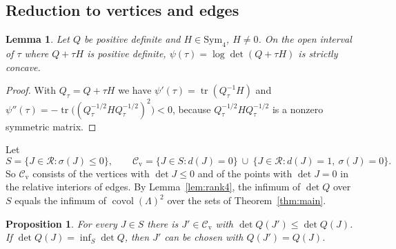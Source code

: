 \documentclass[11pt,reqno]{amsart}
\renewcommand{\_}{\origunderscore\allowbreak}
\numberwithin{equation}{section}
\theoremstyle{plain}
\newtheorem{prop}[thm]{Proposition}
\newtheorem{lem}[thm]{Lemma}
\theoremstyle{definition}
\theoremstyle{remark}
\newcommand{\Rk}{\mathcal{R}}
\newcommand{\Sym}{\mathrm{Sym}}
\newcommand{\covol}{\operatorname{covol}}
\newcommand{\cand}{\mathcal{C}_{\mathrm{v}}}
\begin{document}
\subsection{Reduction to vertices and edges}\label{sec:reduction}

\begin{lem}\label{lem:logdet}
Let $Q$ be positive definite and $H\in\Sym_4$, $H\ne0$. On the open interval of $\tau$ where $Q+\tau H$ is positive definite, $\psi(\tau)=\log\det(Q+\tau H)$ is strictly concave.
\end{lem}

\begin{proof}
With $Q_\tau=Q+\tau H$ we have $\psi'(\tau)=\operatorname{tr}(Q_\tau^{-1}H)$ and $\psi''(\tau)=-\operatorname{tr}\bigl((Q_\tau^{-1/2}HQ_\tau^{-1/2})^2\bigr)<0$, because $Q_\tau^{-1/2}HQ_\tau^{-1/2}$ is a nonzero symmetric matrix.
\end{proof}

Let
\[
S=\{J\in\Rk:\sigma(J)\le0\},\qquad
\cand=\{J\in S: d(J)=0\}\ \cup\ \{J\in\Rk: d(J)=1,\ \sigma(J)=0\}.
\]
So $\cand$ consists of the vertices with $\det J\le0$ and of the points with $\det J=0$ in the relative interiors of edges. By Lemma~\ref{lem:rank4}, the infimum of $\det Q$ over $S$ equals the infimum of $\covol(\Lambda)^2$ over the sets of Theorem~\ref{thm:main}.

\begin{prop}\label{prop:descent}
For every $J\in S$ there is $J'\in\cand$ with $\det Q(J')\le\det Q(J)$. If $\det Q(J)=\inf_S\det Q$, then $J'$ can be chosen with $Q(J')=Q(J)$.
\end{prop}
\end{document}
